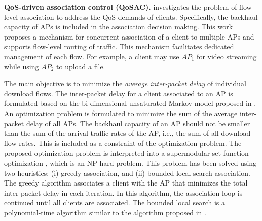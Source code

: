 %



 

\textbf{QoS-driven association control (QoSAC).}
\label{QoS-DAM}
\cite{flow-level-DAM} investigates the problem of flow-level association to address the QoS demands of clients.
Specifically, the backhaul capacity of APs is included in the association decision making.
This work proposes a mechanism for concurrent association of a client to multiple APs and supports flow-level routing of traffic. 
This mechanism facilitates dedicated management of each flow. 
For example, a client may use $AP_{1}$ for video streaming while using $AP_{2}$ to upload a file.

The main objective is to minimize the \textit{average inter-packet delay} of individual download flows. 
The inter-packet delay for a client associated to an AP is formulated based on the bi-dimensional unsaturated Markov model proposed in \cite{802.11n-AP-Association-2014}. 
An optimization problem is formulated to minimize the sum of the average inter-packet delay of all APs. 
The backhaul capacity of an AP should not be smaller than the sum of the arrival traffic rates of the AP, i.e., the sum of all download flow rates. 
This is included as a constraint of the optimization problem.
The proposed optimization problem is interpreted into a supermodular set function optimization \cite{supermodular}, which is an NP-hard problem. 
This problem has been solved using two heuristics: (i) greedy association, and (ii) bounded local search association. 
The greedy algorithm associates a client with the AP that minimizes the total inter-packet delay in each iteration.
In this algorithm, the association loop is continued until all clients are associated. 
The bounded local search is a polynomial-time algorithm similar to the algorithm proposed in \cite{boundedAlg}.


